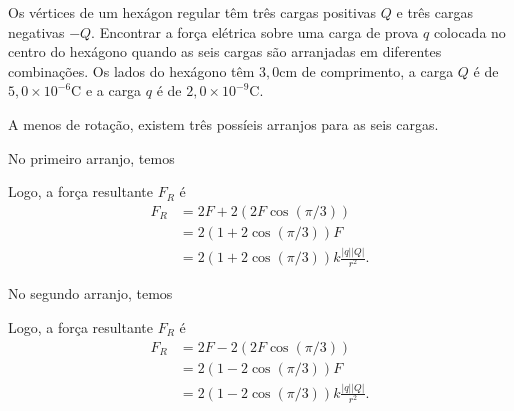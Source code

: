 \documentclass[a4paper,12pt, leqno, answers]{exam}
\newcommand{\abs}[1]{\lvert #1 \rvert}
\begin{document}
\begin{questions}
  \question Os v\'{e}rtices de um hex\'{a}gon regular t\^{e}m tr\^{e}s cargas
  positivas $Q$ e tr\^{e}s cargas negativas $-Q$. Encontrar a for\c{c}a
  el\'{e}trica sobre uma carga de prova $q$ colocada no centro do hex\'{a}gono
  quando as seis cargas s\~{a}o arranjadas em diferentes combina\c{c}\~{o}es. Os
  lados do hex\'{a}gono t\^{e}m $3,0$cm de comprimento, a carga $Q$ \'{e} de
  $5,0 \times 10^{-6}$C e a carga $q$ \'{e} de $2,0 \times 10^{-9}$C.
  \begin{solution}
    A menos de rota\c{c}\~{a}o, existem tr\^{e}s poss\'{i}eis arranjos para as seis cargas.

    No primeiro arranjo, temos
    \begin{center}
    \end{center}
    Logo, a for\c{c}a resultante $F_R$ \'{e}
    \begin{align*}
      F_R &= 2F + 2 \left( 2F \cos(\pi/3) \right) \\
      &= 2 \left( 1 + 2 \cos(\pi/3) \right) F \\
      &= 2 \left( 1 + 2 \cos(\pi/3) \right) k \frac{\abs{q} \abs{Q}}{r^2}.
    \end{align*}

    No segundo arranjo, temos
    \begin{center}
    \end{center}
    Logo, a for\c{c}a resultante $F_R$ \'{e}
    \begin{align*}
      F_R &= 2F - 2 \left( 2F \cos(\pi/3) \right) \\
      &= 2 \left( 1 - 2 \cos(\pi/3) \right) F \\
      &= 2 \left( 1 - 2 \cos(\pi/3) \right) k \frac{\abs{q} \abs{Q}}{r^2}.
    \end{align*}


\end{solution}
\end{questions}
\end{document}
